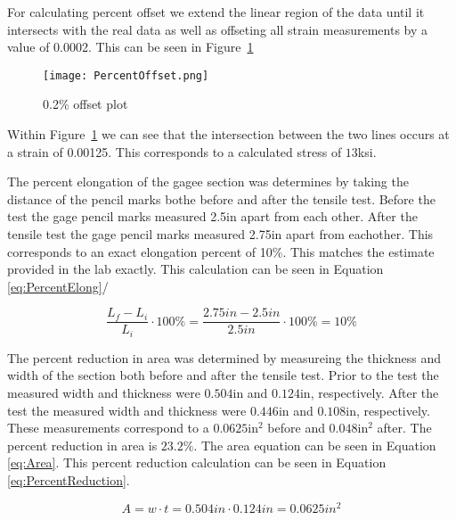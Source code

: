 \documentclass{article}
\begin{document}

For calculating percent offset we extend the linear region of the data until it intersects with the real data as well as offseting all strain measurements by a value of 0.0002. This can be seen in Figure~\ref{fig:PercentOffset}

\begin{figure}[H]
\begin{center}
\texttt{[image: PercentOffset.png]}
\caption{0.2\% offset plot}
\label{fig:PercentOffset}
\end{center}
\end{figure}

Within Figure~\ref{fig:PercentOffset} we can see that the intersection between the two lines occurs at a strain of 0.00125. This corresponds to a calculated stress of $13$ksi.


The percent elongation of the gagee section was determines by taking the distance of the pencil marks bothe before and after the tensile test. Before the test the gage pencil marks measured 2.5in apart from each other. After the tensile test the gage pencil marks measured 2.75in apart from eachother. This corresponds to an exact elongation percent of 10\%. This matches the estimate provided in the lab exactly. This calculation can be seen in Equation \ref{eq:PercentElong}/

\begin{equation}
\frac{L_f - L_i}{L_i}\cdot 100\% = \frac{2.75in - 2.5in}{2.5in}\cdot 100\% = 10\%
\label{eq:PercentElong}
\end{equation}


The percent reduction in area was determined by measureing the thickness and width of the section both before and after the tensile test. Prior to the test the measured width and thickness were $0.504$in and $0.124$in, respectively. After the test the measured width and thickness were $0.446$in and $0.108$in, respectively. These measurements correspond to a $0.0625$in$^2$ before and $0.048$in$^2$ after. The percent reduction in area is $23.2\%$. The area equation can be seen in Equation \ref{eq:Area}. This percent reduction calculation can be seen in Equation \ref{eq:PercentReduction}.

\begin{equation}
A = w\cdot t = 0.504in \cdot 0.124in = 0.0625in^2
\label{eq:Area}
\end{equation}
\end{document}
